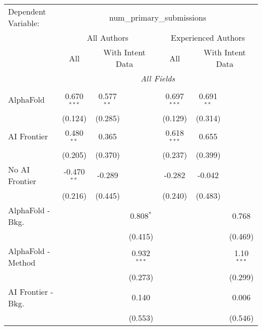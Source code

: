 \begingroup
\centering
\begin{tabular}{lcccccc}
   \tabularnewline \midrule \midrule
   Dependent Variable: & \multicolumn{6}{c}{num\_primary\_submissions}\\
 & \multicolumn{3}{c}{All Authors} & \multicolumn{3}{c}{Experienced Authors} \\
\cmidrule(lr){2-4} \cmidrule(lr){5-7}
 & \multicolumn{1}{c}{All} & \multicolumn{2}{c}{With Intent Data} & \multicolumn{1}{c}{All} & \multicolumn{2}{c}{With Intent Data} \\
\cmidrule(lr){2-2} \cmidrule(lr){3-4} \cmidrule(lr){5-5} \cmidrule(lr){6-7}
 & \multicolumn{6}{c}{\textit{All Fields}} \\ \\
   AlphaFold               & 0.670$^{***}$ & 0.577$^{**}$ &               & 0.697$^{***}$ & 0.691$^{**}$ &   \\   
                           & (0.124)       & (0.285)      &               & (0.129)       & (0.314)      &   \\   
   AI Frontier             & 0.480$^{**}$  & 0.365        &               & 0.618$^{***}$ & 0.655        &   \\   
                           & (0.205)       & (0.370)      &               & (0.237)       & (0.399)      &   \\   
   No AI Frontier          & -0.470$^{**}$ & -0.289       &               & -0.282        & -0.042       &   \\   
                           & (0.216)       & (0.445)      &               & (0.240)       & (0.483)      &   \\   
   AlphaFold - Bkg.        &               &              & 0.808$^{*}$   &               &              & 0.768\\   
                           &               &              & (0.415)       &               &              & (0.469)\\   
   AlphaFold - Method      &               &              & 0.932$^{***}$ &               &              & 1.10$^{***}$\\   
                           &               &              & (0.273)       &               &              & (0.299)\\   
   AI Frontier - Bkg.      &               &              & 0.140         &               &              & 0.006\\   
                           &               &              & (0.553)       &               &              & (0.546)\\   

\end{tabular}
